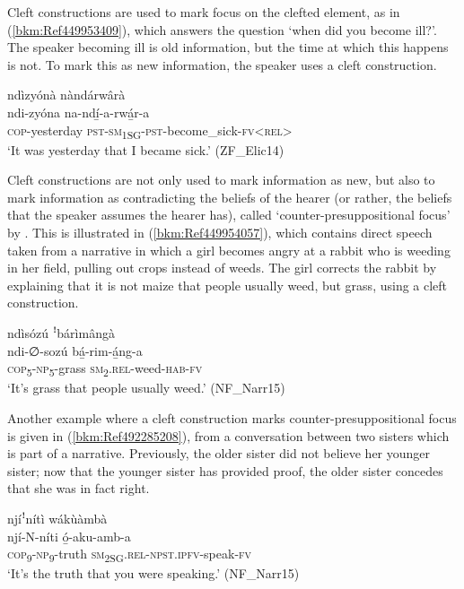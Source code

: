 Cleft constructions are used to mark focus on the clefted element, as in (\ref{bkm:Ref449953409}), which answers the question ‘when did you become ill?’. The speaker becoming ill is old information, but the time at which this happens is not. To mark this as new information, the speaker uses a cleft construction.

\ea
\label{bkm:Ref449953409}
ndìzyónà nàndárwârà\\
\gll ndi-zyóna    na-ndí̲-a-rwá̲r-a\\
\textsc{cop}-yesterday  \textsc{pst}-\textsc{sm}\textsubscript{1SG}-\textsc{pst}-become\_sick-\textsc{fv}<\textsc{rel}>\\
\glt ‘It was yesterday that I became sick.’ (ZF\_Elic14)
\z

Cleft constructions are not only used to mark information as new, but also to mark information as contradicting the beliefs of the hearer (or rather, the beliefs that the speaker assumes the hearer has), called ‘counter-presuppositional focus’ by \citet[332]{Dik1997}. This is illustrated in (\ref{bkm:Ref449954057}), which contains direct speech taken from a narrative in which a girl becomes angry at a rabbit who is weeding in her field, pulling out crops instead of weeds. The girl corrects the rabbit by explaining that it is not maize that people usually weed, but grass, using a cleft construction.

\ea
\label{bkm:Ref449954057}
ndìsózú ꜝbárìmângà\\
\gll ndi-∅-sozú    bá̲-rim-á̲ng-a\\
\textsc{cop}\textsubscript{5}-\textsc{np}\textsubscript{5}-grass  \textsc{sm}\textsubscript{2}.\textsc{rel}-weed-\textsc{hab}-\textsc{fv}\\
\glt ‘It’s grass that people usually weed.’ (NF\_Narr15)
\z

Another example where a cleft construction marks counter-presuppositional focus is given in (\ref{bkm:Ref492285208}), from a conversation between two sisters which is part of a narrative. Previously, the older sister did not believe her younger sister; now that the younger sister has provided proof, the older sister concedes that she was in fact right.

\ea
\label{bkm:Ref492285208}
njíꜝnítì wákùàmbà\\
\gll njí-N-níti    ó̲-aku-amb-a\\
\textsc{cop}\textsubscript{9}-\textsc{np}\textsubscript{9}-truth  \textsc{sm}\textsubscript{2SG}.\textsc{rel}-\textsc{npst}.\textsc{ipfv}-speak-\textsc{fv}\\
\glt ‘It’s the truth that you were speaking.’ (NF\_Narr15)
\z

